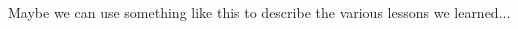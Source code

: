 \documentclass{article}
\begin{document}






\begin{framed}
 \\
Maybe we can use something like this to describe the various lessons we
learned...
\end{framed}



\begin{thebibliography}{1}



\end{thebibliography}
\end{document}
